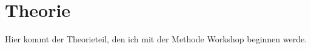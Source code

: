 \section{Theorie} \label{section:theorie}
Hier kommt der Theorieteil, den ich mit der Methode Workshop beginnen werde.